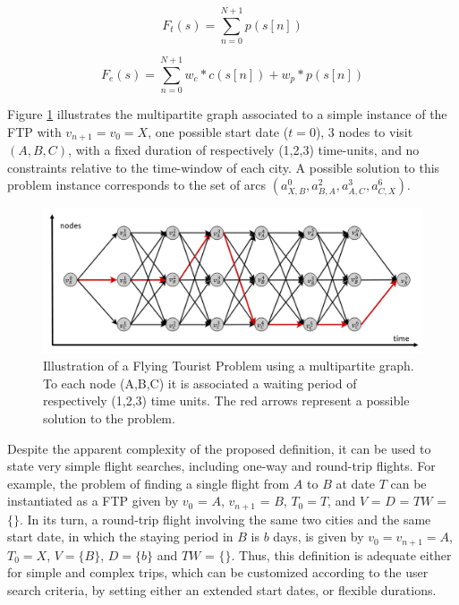 \begin{equation}
\label{eq:obj_time}
  F_{t}(s) = \sum_{n=0}^{N+1} p(s[n])
\end{equation}

\begin{equation}
\label{eq:obj_entropy}
  F_{e}(s) = \sum_{n=0}^{N+1} w_c*c(s[n]) + w_p*p(s[n])
\end{equation}

Figure \ref{fig:multipartite_sol} illustrates the multipartite graph associated
to a simple instance of the FTP with $v_{n+1} = v_0 = X$, one possible start
date ($t = 0$), 3 nodes to visit $(A, B, C)$, with a fixed duration of
respectively (1,2,3) time-units, and no constraints relative to the time-window
of each city. A possible solution to this problem instance corresponds to the
set of arcs $(a_{X,B}^{0}, a_{B,A}^{2}, a_{A,C}^{3}, a_{C,X}^{6})$.

\begin{figure}[tbp]
  \centering
  \includegraphics[width=1.0\columnwidth]{./imgs/multipartite_axis.png}
  \caption{Illustration of a Flying Tourist Problem using a multipartite graph. To each node (A,B,C) it is associated a waiting period of respectively (1,2,3) time units. The red arrows represent a possible solution to the problem.}
  \label{fig:multipartite_sol}  
\end{figure}


Despite the apparent complexity of the proposed definition, it can be used to
state very simple flight searches, including one-way and round-trip flights. For
example, the problem of finding a single flight from $A$ to $B$ at date $T$ can
be instantiated as a FTP given by $v_0$ = $A$, $v_{n+1}$ = $B$, $T_{0} = T$, and
$V$ = $D$ = $TW$ = $\{\}$. In its turn, a round-trip flight involving the same
two cities and the same start date, in which the staying period in $B$ is $b$
days, is given by $v_0 = v_{n+1} = A$, $T_{0} = X$, $V = \{B\}$, $D = \{b\}$ and
$TW$ = $\{\}$. Thus, this definition is adequate either for simple and complex
trips, which can be customized according to the user search criteria, by setting
either an extended start dates, or flexible durations.